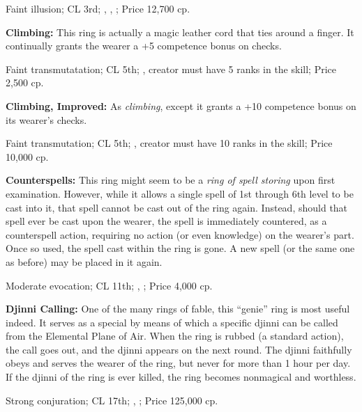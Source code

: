 Faint illusion; CL 3rd; , , ; Price 12,700 cp.

\textbf{Climbing:} This ring is actually a magic leather cord that ties around a finger. It continually grants the wearer a +5 competence bonus on  checks.

Faint transmutatation; CL 5th; , creator must have 5 ranks in the  skill; Price 2,500 cp.

\textbf{Climbing, Improved:} As \emph{climbing}, except it grants a +10 competence bonus on its wearer's  checks.

Faint transmutation; CL 5th; , creator must have 10 ranks in the  skill; Price 10,000 cp.

\textbf{Counterspells:} This ring might seem to be a \emph{ring of spell storing} upon first examination. However, while it allows a single spell of 1st through 6th level to be cast into it, that spell cannot be cast out of the ring again. Instead, should that spell ever be cast upon the wearer, the spell is immediately countered, as a counterspell action, requiring no action (or even knowledge) on the wearer's part. Once so used, the spell cast within the ring is gone. A new spell (or the same one as before) may be placed in it again.

Moderate evocation; CL 11th; , ; Price 4,000 cp.

\textbf{Djinni Calling:} One of the many rings of fable, this ``genie'' ring is most useful indeed. It serves as a special  by means of which a specific djinni can be called from the Elemental Plane of Air. When the ring is rubbed (a standard action), the call goes out, and the djinni appears on the next round. The djinni faithfully obeys and serves the wearer of the ring, but never for more than 1 hour per day. If the djinni of the ring is ever killed, the ring becomes nonmagical and worthless.

Strong conjuration; CL 17th; , ; Price 125,000 cp.


